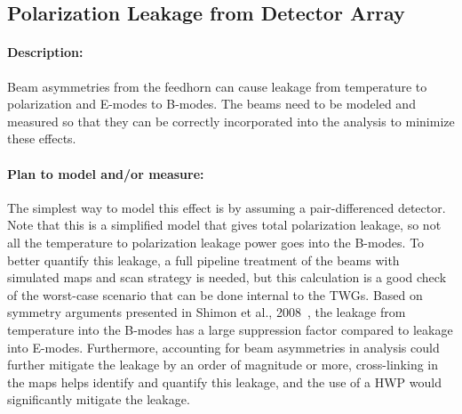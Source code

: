 \subsection{Polarization Leakage from Detector Array}

\paragraph{Description:}

Beam asymmetries from the feedhorn can cause leakage from temperature to polarization and E-modes to B-modes. The beams need to be modeled and measured so that they can be correctly incorporated into the analysis to minimize these effects.

\paragraph{Plan to model and/or measure:}
The simplest way to model this effect is by assuming a pair-differenced detector. Note that this is a simplified model that gives total polarization leakage, so not all the temperature to polarization leakage power goes into the B-modes. To better quantify this leakage, a full pipeline treatment of the beams with simulated maps and scan strategy is needed, but this calculation is a good check of the worst-case scenario that can be done internal to the TWGs. Based on symmetry arguments presented in Shimon et al., 2008~\cite{Shimon_2008}, the leakage from temperature into the B-modes has a large suppression factor compared to leakage into E-modes. Furthermore, accounting for beam asymmetries in analysis could further mitigate the leakage by an order of magnitude or more, cross-linking in the maps helps identify and quantify this leakage, and the use of a HWP would significantly mitigate the leakage.

